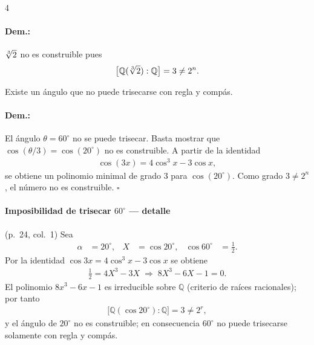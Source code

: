 \documentclass[landscape,a4paper]{article}
\begin{document}
\begin{multicols}{4}
\paragraph{Dem.:} $\root 3 \of 2$ no es construible pues
\begin{align*}
  \bigl[\mathbb{Q}(\root 3 \of 2):\mathbb{Q}\bigr] = 3 \neq 2^{n}.
\end{align*}
\vspace{0.5em}
\begin{tcolorbox}[colback=white,colframe=red!80!black,colbacktitle=red!80!black,coltitle=white,title={Proposición (Trisección) (p.~23, col.~4)}]
Existe un ángulo que no puede trisecarse con regla y compás.
\end{tcolorbox}
\paragraph{Dem.:} El ángulo $\theta = 60^{\circ}$ no se puede trisecar.  Basta mostrar que $\cos(\theta/3)=\cos(20^{\circ})$ no es construible.
A partir de la identidad
\begin{align*}
  \cos(3x)=4\cos^{3}x-3\cos x,
\end{align*}
se obtiene un polinomio minimal de grado $3$ para $\cos(20^{\circ})$.  Como grado $3\neq 2^{n}$, el número no es construible. \hfill$\square$


\paragraph{Imposibilidad de trisecar $60^{\circ}$ — detalle} (p.~24, col.~1)
Sea
\begin{align*}
  \alpha &= 20^{\circ}, & X &= \cos 20^{\circ}, & \cos 60^{\circ} &= \tfrac12.
\end{align*}
Por la identidad $\cos 3x = 4\cos^{3}x - 3\cos x$ se obtiene
\begin{align*}
  \tfrac12 = 4X^{3} - 3X \;\Longrightarrow\; 8X^{3} - 6X - 1 = 0.
\end{align*}
El polinomio $8x^{3} - 6x - 1$ es irreducible sobre $\mathbb{Q}$ (criterio de raíces racionales); por tanto
\begin{align*}
  \bigl[\mathbb{Q}(\cos 20^{\circ}) : \mathbb{Q}\bigr] = 3 \neq 2^{r},
\end{align*}
y el ángulo de $20^{\circ}$ no es construible; en consecuencia $60^{\circ}$ no puede trisecarse solamente con regla y compás.


\end{multicols}
\end{document}
